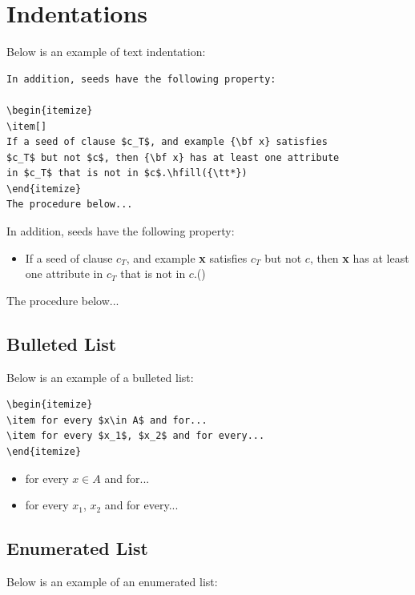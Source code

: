 \documentclass[withtitlethanks]{actacyb}
\begin{document}
\section{Indentations}

Below is an example of text indentation:

\begin{verbatim}
In addition, seeds have the following property:

\begin{itemize}
\item[] 
If a seed of clause $c_T$, and example {\bf x} satisfies 
$c_T$ but not $c$, then {\bf x} has at least one attribute 
in $c_T$ that is not in $c$.\hfill({\tt*})
\end{itemize}
The procedure below...
\end{verbatim}

In addition, seeds have the following property:

\begin{itemize}
\item[] 
If a seed of clause $c_T$, and example {\bf x} satisfies $c_T$ but
not $c$, then {\bf x} has at least one attribute in $c_T$ that
is not in $c$.\hfill({\tt*})
\end{itemize}
The procedure below...

\subsection{Bulleted List}

Below is an example of a bulleted list:

\begin{verbatim}
\begin{itemize}
\item for every $x\in A$ and for...
\item for every $x_1$, $x_2$ and for every...
\end{itemize} 
\end{verbatim}

\begin{itemize}
\item for every $x\in A$ and for...
\item for every $x_1$, $x_2$ and for every...
\end{itemize} 

\subsection{Enumerated List}
Below is an example of an enumerated list:
\end{document}
